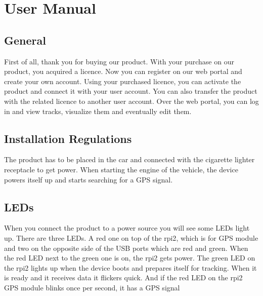 \chapter{User Manual}
\section{General}
First of all, thank you for buying our product. With your purchase on our product, you acquired a licence. Now you can register on our web portal and create your own account. Using your purchased licence, you can activate the product and connect it with your user account. You can also transfer the product with the related licence to another user account. Over the web portal, you can log in and view tracks, visualize them and eventually edit them.
\section{Installation Regulations}
The product has to be placed in the car and connected with the cigarette lighter receptacle to get power. When starting the engine of the vehicle, the device powers itself up and starts searching for a GPS signal.
\section{LEDs}
When you connect the product to a power source you will see some LEDs light up.
There are three LEDs. A red one on top of the \gls{rpi2}, which is for GPS module and two on the opposite side of the USB ports which are red and green.
When the red LED next to the green one is on, the \gls{rpi2} gets power.
The green LED on the \gls{rpi2} lights up when the device boots and prepares itself for tracking. When it is ready and it receives data it flickers quick.
And if the red LED on the \gls{rpi2} GPS module blinks once per second, it has a GPS signal
